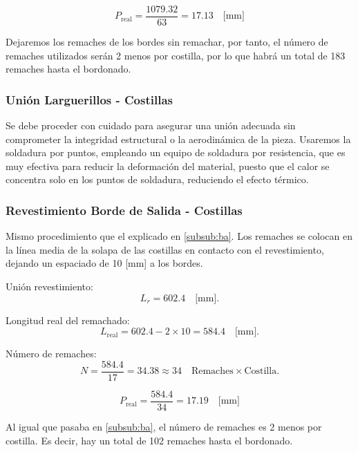 \begin{equation}
    P_{\text{real}} = \dfrac{1079.32}{63} = 17.13 \quad \text{[mm]}
\end{equation}

Dejaremos los remaches de los bordes sin remachar, por tanto, el número de remaches utilizados serán 2 menos por costilla, por lo que habrá un total de 183 remaches hasta el bordonado.

\subsubsection{Unión Larguerillos - Costillas}
Se debe proceder con cuidado para asegurar una unión adecuada sin comprometer la integridad estructural o la aerodinámica de la pieza. Usaremos la soldadura por puntos, empleando un equipo de soldadura por resistencia, que es muy efectiva para reducir la deformación del material, puesto que el calor se concentra solo en los puntos de soldadura, reduciendo el efecto térmico.

\subsubsection{Revestimiento Borde de Salida - Costillas} \label{subsub:bs}
Mismo procedimiento que el explicado en \ref{subsub:ba}. Los remaches se colocan en la línea media de la solapa de las costillas en contacto con el revestimiento, dejando un espaciado de 10 [mm] a los bordes.

Unión revestimiento:
\begin{equation}
    L_r = 602.4 \quad \text{[mm]}.
\end{equation}

Longitud real del remachado:
\begin{equation}
    L_{\text{real}} = 602.4 - 2 \times 10 = 584.4 \quad \text{[mm]}.
\end{equation}

Número de remaches:
\begin{equation}
    N = \dfrac{584.4}{17} = 34.38 \approx 34 \quad \text{Remaches} \times \text{Costilla}.
\end{equation}

\begin{equation}
    P_{\text{real}} = \dfrac{584.4}{34} = 17.19 \quad \text{[mm]}
\end{equation}

Al igual que pasaba en \ref{subsub:ba}, el número de remaches es 2 menos por costilla. Es decir, hay un total de 102 remaches hasta el bordonado.

